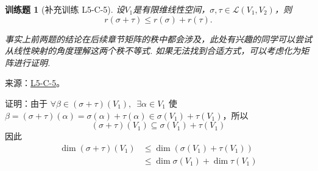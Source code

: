 \documentclass[12pt,fontset=fandol]{ctexart}
\newtheorem{exercise}{训练题}[section]
\begin{document}
\begin{exercise}[补充训练 L5-C-5]\label{prob:L5-C-5}
设$V_1$是有限维线性空间，$\sigma,\tau\in \mathcal{L}(V_1,V_2)$，则
        \[r(\sigma+\tau) \leqslant r(\sigma)+r(\tau).\]

        事实上前两题的结论在后续章节矩阵的秩中都会涉及，此处有兴趣的同学可以尝试从线性映射的角度理解这两个秩不等式. 如果无法找到合适方式，可以考虑化为矩阵进行证明.
\end{exercise}
\noindent 来源：\href{https://github.com/yhwu-is/Linear-Algebra-Left-Undone/blob/new/%E8%AE%B2%E4%B9%89/%E4%B8%93%E9%A2%98/5%20%E7%BA%BF%E6%80%A7%E6%98%A0%E5%B0%84.tex}{L5-C-5}。
\begin{solve}
证明：由于 $ \forall \beta \in (\sigma + \tau)(V_1),\enspace \exists \alpha \in V_1 $ 使 $ \beta = (\sigma + \tau)(\alpha) = \sigma(\alpha) + \tau(\alpha) \in \sigma(V_1) + \tau(V_1) $，所以
          \[ (\sigma + \tau)(V_1) \subseteq \sigma(V_1) + \tau(V_1) \]
          因此
          \begin{align*}
              \dim(\sigma + \tau)(V_1) & \leqslant \dim(\sigma(V_1) + \tau(V_1))     \\
                                       & \leqslant \dim \sigma(V_1) + \dim \tau(V_1)
          \end{align*}
\end{solve}
\end{document}
